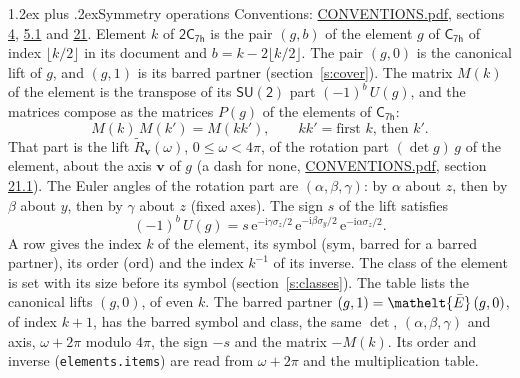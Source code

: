\documentclass[10pt,a4paper]{article}
\makeatletter
\renewcommand\section{\@startsection{section}{1}{\z@}{-3ex plus -1ex minus -.2ex}%
  {1.2ex plus .2ex}{\normalfont\large\sffamily\bfseries\color{parttitle}}}
\numberwithin{equation}{section}
\newcommand{\eltfont}[1]{{\let\sigma\eltsigma\mathelt{#1}}}
\newcommand{\grp}[1]{\mathsf{#1}}
\newcommand{\elt}[1]{\eltfont{#1}}
\newcommand{\vv}{\mathbf{v}}
\newcommand{\iunit}{\mathrm{i}}
\newcommand{\expe}{\mathrm{e}}
\newcommand{\barred}[1]{\bar{#1}}
\newcommand{\lift}[1]{\tilde{#1}}
\newcommand{\pauli}[1]{\sigma_{#1}}
\makeatother
\begin{document}
\section{Symmetry operations}\label{s:elements}
Conventions: \href{../../CONVENTIONS.pdf}{CONVENTIONS.pdf}, sections \href{../../../rotation/CONVENTIONS.pdf\#conv.4}{4}, \href{../../../rotation/CONVENTIONS.pdf\#conv.5.1}{5.1} and \href{../../CONVENTIONS.pdf\#conv.21}{21}.
\leavevmode\label{n:index.element}\label{n:element.g}Element $k$ of $\grp{2C_{7h}}$ is the pair $(g, b)$ of the element $g$ of \href{../../../rotation/data/pdf/C7h.pdf}{$\grp{C_{7h}}$} of index $\lfloor k/2\rfloor$ in its document and $b = k - 2\lfloor k/2\rfloor$. The pair $(g, 0)$ is the canonical lift of $g$, and $(g, 1)$ is its barred partner (section~\ref{s:cover}). \label{n:matrix.element.pin}\label{n:matrix.element}The matrix $M(k)$ of the element is the transpose of its $\grp{SU(2)}$ part $(-1)^{b}\,U(g)$, and the matrices compose as the matrices $P(g)$ of the elements of $\grp{C_{7h}}$:
\begin{equation}\label{e:mprod}M(k)\,M(k') = M(kk'),\qquad kk' = \text{first } k\text{, then } k'.\end{equation}
\leavevmode\label{n:angle.omega}\label{n:vector.axis}\label{n:vector.pole}That part is the lift $\lift{R}_{\vv}(\omega)$, $0 \le \omega < 4\pi$, of the rotation part $(\det g)\,g$ of the element, about the axis $\vv$ of $g$ (a dash for none, \href{../../CONVENTIONS.pdf}{CONVENTIONS.pdf}, section \href{../../CONVENTIONS.pdf\#conv.21.1}{21.1}). \label{n:angle.euler.alpha}\label{n:angle.euler.beta}\label{n:angle.euler.gamma}\label{n:vector.coordinates}The Euler angles of the rotation part are $(\alpha,\beta,\gamma)$: by $\alpha$ about $z$, then by $\beta$ about $y$, then by $\gamma$ about $z$ (fixed axes). \label{n:local.euler.sign}The sign $s$ of the lift satisfies
\begin{equation}\label{e:euler}(-1)^{b}\,U(g) = s\,\expe^{-\iunit\gamma\pauli{z}/2}\,\expe^{-\iunit\beta\pauli{y}/2}\,\expe^{-\iunit\alpha\pauli{z}/2}.\end{equation}
\leavevmode\label{n:index.element.inverse}\label{n:head.sym}\label{n:head.ord}A row gives the index $k$ of the element, its symbol (sym, barred for a barred partner), its order (ord) and the index $k^{-1}$ of its inverse. \label{n:head.class}The class of the element is set with its size before its symbol (section~\ref{s:classes}).
The table lists the canonical lifts $(g, 0)$, of even $k$. The barred partner $(g, 1) = \elt{\barred{E}}\,(g, 0)$, of index $k + 1$, has the barred symbol and class, the same $\det$, $(\alpha,\beta,\gamma)$ and axis, $\omega + 2\pi$ modulo $4\pi$, the sign $-s$ and the matrix $-M(k)$. Its order and inverse (\texttt{elements.items}) are read from $\omega + 2\pi$ and the multiplication table.
\end{document}

